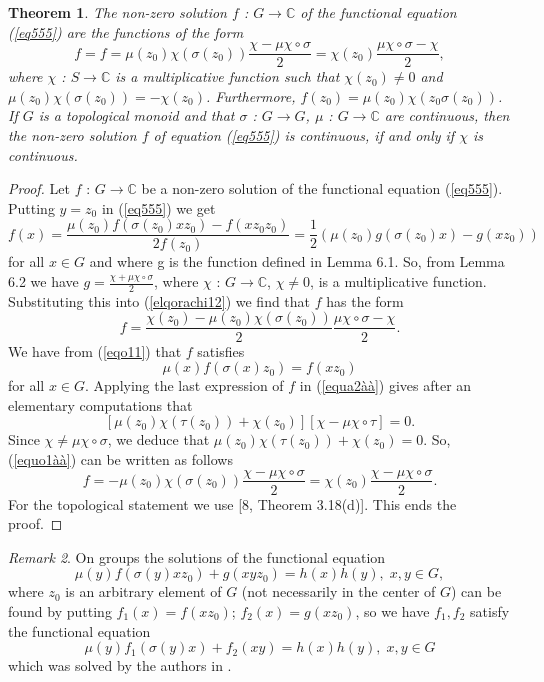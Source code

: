 \documentclass[12pt]{amsart}
\newtheorem{thm}{Theorem}[section]
\theoremstyle{definition}
\theoremstyle{remark}
\newtheorem{rem}[thm]{Remark}
\numberwithin{equation}{section}
\begin{document}
 \begin{thm} The non-zero solution $f$ : $G\longrightarrow \mathbb{C}$ of
the functional equation (\ref{eq555}) are the functions of the form
\begin{equation}\label{eq300}
    f=f=\mu(z_0)\chi(\sigma(z_0))\frac{\chi-\mu\chi\circ\sigma}{2}=\chi(z_0)\frac{\mu\chi\circ\sigma-\chi}{2},
\end{equation}where $\chi$ : $S\longrightarrow \mathbb{C}$ is a
multiplicative function such that $\chi(z_0)\neq 0$ and
$\mu(z_0)\chi(\sigma(z_0))=-\chi(z_0)$. Furthermore,
$f(z_0)=\mu(z_0)\chi(z_0\sigma(z_0))$.\\If $G$ is a topological
monoid and that $\sigma$ : $G\longrightarrow G$, $\mu$ :
$G\longrightarrow \mathbb{C}$ are continuous, then the non-zero
solution $f$ of equation (\ref{eq555}) is continuous, if and only if
$\chi$ is continuous.
\end{thm}\begin{proof} Let $f$ : $G\longrightarrow \mathbb{C}$ be a
non-zero solution of the functional equation (\ref{eq555}). Putting
$y=z_0$ in (\ref{eq555}) we get
\begin{equation}\label{elqorachi12}
f(x)=\frac{\mu(z_0)f(\sigma(z_0)xz_0)-f(xz_0z_0)}{2f(z_0)}=\frac{1}{2}(\mu(z_0)g(\sigma(z_0)x)-g(xz_0))\end{equation}
for all $x\in G$ and where g is the function defined in Lemma 6.1.
So, from Lemma 6.2 we have $g=\frac{\chi+\mu\chi\circ \sigma}{2}$,
where $\chi$ : $G\longrightarrow \mathbb{C}$, $\chi\neq 0$, is a
multiplicative function. Substituting this into (\ref{elqorachi12})
we find that $f$ has the form
\begin{equation}\label{equo1àà}
    f=\frac{\chi(z_0)-\mu(z_0)\chi(\sigma(z_0))}{2}\frac{\mu\chi\circ\sigma-\chi}{2}.
\end{equation} We have from (\ref{eqo11}) that $f$ satisfies
\begin{equation}\label{equa2àà}
\mu(x)f(\sigma(x)z_0)=f(xz_0)\end{equation}
 for all $x\in G$.
Applying the last expression of $f$ in  (\ref{equa2àà}) gives after
an elementary computations that
$$[\mu(z_0)\chi(\tau(z_0))+\chi(z_0)][\chi-\mu\chi\circ\tau]=0.$$ Since $\chi\neq \mu\chi\circ\sigma$, we deduce that $\mu(z_0)\chi(\tau(z_0))+\chi(z_0)=0$.
So, (\ref{equo1àà}) can be written as follows
$$f=-\mu(z_0)\chi(\sigma(z_0))\frac{\chi-\mu\chi\circ\sigma}{2}=\chi(z_0)\frac{\chi-\mu\chi\circ\sigma}{2}.$$
For the topological statement we use [8, Theorem 3.18(d)]. This ends
the proof. \end{proof} \begin{rem}On groups the solutions of the
functional equation
$$\mu(y)f(\sigma(y)xz_0)+g(xyz_0)=h(x)h(y), \; x,y\in G,$$ where $z_0$ is an arbitrary element of $G$ (not necessarily in the center of $G$) can be found by putting
$f_1(x)=f(xz_0)$; $f_2(x)=g(xz_0)$, so we have $f_1,f_2$ satisfy the
functional equation
$$\mu(y)f_1(\sigma(y)x)+f_2(xy)=h(x)h(y),\; x,y\in G$$ which was
solved by the authors in \cite{preprint}.
\end{rem}
\end{document}
